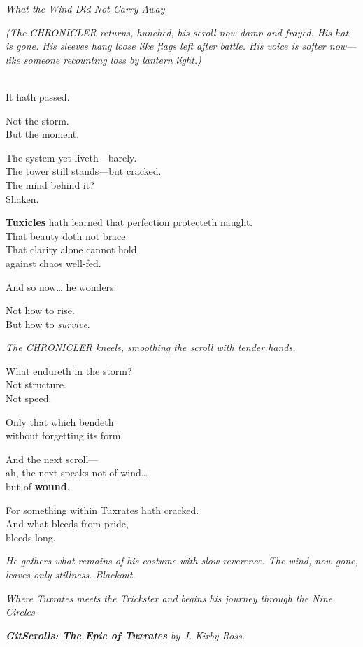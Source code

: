\emph{What the Wind Did Not Carry Away}

\emph{(The CHRONICLER returns, hunched, his scroll now damp and frayed. His hat is gone. His sleeves hang loose like flags left after battle. His voice is softer now---like someone recounting loss by lantern light.)}

\\
It hath passed.

Not the storm.\\
But the moment.

The system yet liveth---barely.\\
The tower still stands---but cracked.\\
The mind behind it?\\
Shaken.

\textbf{Tuxicles} hath learned that perfection protecteth naught.\\
That beauty doth not brace.\\
That clarity alone cannot hold\\
against chaos well-fed.

And so now\ldots{} he wonders.

Not how to rise.\\
But how to \emph{survive}.

\emph{The CHRONICLER kneels, smoothing the scroll with tender hands.}

What endureth in the storm?\\
Not structure.\\
Not speed.

Only that which bendeth\\
without forgetting its form.

And the next scroll---\\
ah, the next speaks not of wind\ldots{}\\
but of \textbf{wound}.

For something within Tuxrates hath cracked.\\
And what bleeds from pride,\\
bleeds long.

\emph{He gathers what remains of his costume with slow reverence. The wind, now gone, leaves only stillness. Blackout.}

\bookdivider

\emph{Where Tuxrates meets the Trickster and begins his journey through the Nine Circles}

\bookdivider

\emph{\textbf{GitScrolls: The Epic of Tuxrates} by J. Kirby Ross.}
